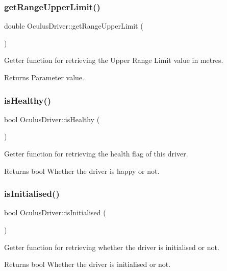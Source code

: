 \subsubsection{\texorpdfstring{get\+Range\+Upper\+Limit()}{getRangeUpperLimit()}}
{\footnotesize\ttfamily double Oculus\+Driver\+::get\+Range\+Upper\+Limit (\begin{DoxyParamCaption}{ }\end{DoxyParamCaption})}

Getter function for retrieving the Upper Range Limit value in metres.

\begin{DoxyReturn}{Returns}
Parameter value. 
\end{DoxyReturn}
\mbox{\label{classOculusDriver_a6ff0df7535000bcfd824936eea60b8ba}} 
\subsubsection{\texorpdfstring{is\+Healthy()}{isHealthy()}}
{\footnotesize\ttfamily bool Oculus\+Driver\+::is\+Healthy (\begin{DoxyParamCaption}{ }\end{DoxyParamCaption})}

Getter function for retrieving the health flag of this driver.

\begin{DoxyReturn}{Returns}
bool Whether the driver is happy or not. 
\end{DoxyReturn}
\mbox{\label{classOculusDriver_aa6922efe578105ad450566dbeca81fce}} 
\subsubsection{\texorpdfstring{is\+Initialised()}{isInitialised()}}
{\footnotesize\ttfamily bool Oculus\+Driver\+::is\+Initialised (\begin{DoxyParamCaption}{ }\end{DoxyParamCaption})}

Getter function for retrieving whether the driver is initialised or not.

\begin{DoxyReturn}{Returns}
bool Whether the driver is initialised or not. 
\end{DoxyReturn}
\mbox{\label{classOculusDriver_aeaea5c301e29068eefd2ad691a46d149}} 
